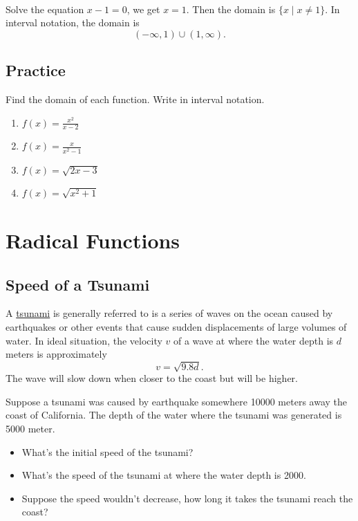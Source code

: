 \documentclass[
  en,11pt]{elegantbook}
\newcommand{\size}[2]{{\fontsize{#1}{0}\selectfont#2}}
\newenvironment{rmdthink}{
	\vspace*{0.5\baselineskip}
	\par\noindent
	\makebox[-4pt][r]{\color{green!90}\size{12}{\faLightbulbO}\,\,}
    \begin{tcolorbox}[
    enhanced,
    title={\textbf{\color{second}Think}},
    title style={left color=blue!10!green!20!white,right color=yellow!20!blue!20!white},
    colback=green!20!white,
    ]
    \sffamily
}{
    \end{tcolorbox}
	\par\ignorespacesafterend
}
\let\BeginKnitrBlock\begin \let\EndKnitrBlock\end
\begin{document}
\BeginKnitrBlock{solution}
{}\\

Solve the equation \(x-1=0\), we get \(x=1\). Then the domain is \(\{x\mid x\neq 1\}\). In interval notation, the domain is
\[
(-\infty, 1)\cup (1,\infty).
\]
\EndKnitrBlock{solution}

\newpage

\hypertarget{practice-13}{%
\section{Practice}\label{practice-13}}

\BeginKnitrBlock{exercise}
\protect\hypertarget{exr:unnamed-chunk-276}{}{\label{exr:unnamed-chunk-276} }
Find the domain of each function. Write in interval notation.

\begin{enumerate}
\def\labelenumi{\arabic{enumi}.}

\item
  \(f(x)=\frac{x^2}{x-2}\)
\item
  \(f(x)=\frac{x}{x^2-1}\)
\item
  \(f(x)=\sqrt{2x-3}\)
\item
  \(f(x)=\sqrt{x^2+1}\)\hfill\null
\end{enumerate}
\EndKnitrBlock{exercise}

\hypertarget{radical-functions}{%
\chapter{Radical Functions}\label{radical-functions}}

\hypertarget{speed-of-a-tsunami}{%
\section{Speed of a Tsunami}\label{speed-of-a-tsunami}}

\begin{rmdthink}

A \href{https://en.wikipedia.org/wiki/Tsunami}{tsunami} is generally referred to is a series of waves on the ocean caused by earthquakes or other events that cause sudden displacements of large volumes of water. In ideal situation, the velocity \(v\) of a wave at where the water depth is \(d\) meters is approximately
\[
v=\sqrt{9.8d}.
\]
The wave will slow down when closer to the coast but will be higher.

Suppose a tsunami was caused by earthquake somewhere 10000 meters away the coast of California. The depth of the water where the tsunami was generated is 5000 meter.

\begin{itemize}

\item
  What's the initial speed of the tsunami?
\item
  What's the speed of the tsunami at where the water depth is 2000.
\item
  Suppose the speed wouldn't decrease, how long it takes the tsunami reach the coast?
\end{itemize}

\end{rmdthink}
\end{document}
